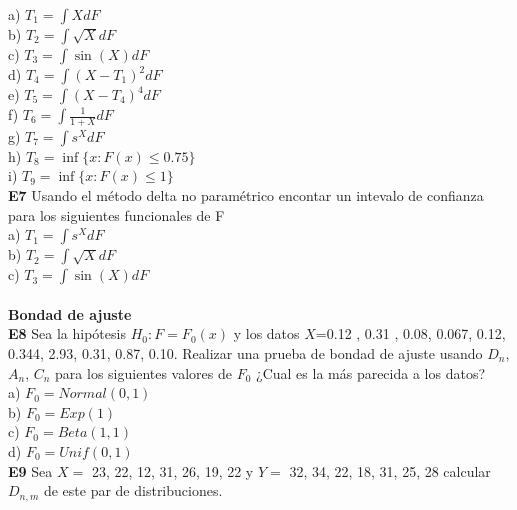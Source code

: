 \documentclass[11pt,spanish]{article}
\begin{document}
\hspace*{6mm} a) $T_1 = \int X dF$ \\
\hspace*{6mm} b) $T_2 = \int \sqrt{X} dF$ \\
\hspace*{6mm} c) $T_3 = \int \sin(X) dF$ \\
\hspace*{6mm} d) $T_4 =\int (X-T_1)^2 dF$ \\
\hspace*{6mm} e) $T_5 =\int (X-T_4)^4 dF$ \\
\hspace*{6mm} f) $T_6 =\int \frac{1}{1+X} dF$ \\
\hspace*{6mm} g) $T_7 =\int s^X dF$ \\
\hspace*{6mm} h) $T_8 =\inf\{x:F(x)\leq 0.75 \}$\\
\hspace*{6mm} i) $T_9 =\inf\{x:F(x)\leq 1 \}$\\
\textbf{E7} Usando el método delta no paramétrico encontar un intevalo de confianza para los siguientes funcionales de F \\
\hspace*{6mm} a) $T_1 =\int s^X dF$ \\
\hspace*{6mm} b) $T_2 = \int \sqrt{X} dF$ \\
\hspace*{6mm} c) $T_3 = \int \sin(X) dF$ \\\\
\textbf{Bondad de ajuste}\\
\textbf{E8} Sea la hipótesis $H_0: F = F_0(x)$ y los datos $X$=0.12 , 0.31 , 0.08, 0.067, 0.12, 0.344, 2.93, 0.31, 0.87, 0.10. Realizar una prueba de bondad de ajuste usando $D_n$, $A_n$, $C_n$ para los siguientes valores de $F_0$ ¿Cual es la más parecida a los datos?\\
\hspace*{6mm} a) $F_0=Normal(0,1)$ \\
\hspace*{6mm} b) $F_0=Exp(1)$\\
\hspace*{6mm} c) $F_0=Beta(1,1)$ \\
\hspace*{6mm} d) $F_0 =Unif(0,1)$ \\
\textbf{E9} Sea $X =$ 23, 22, 12, 31, 26, 19, 22 y $Y=$ 32, 34, 22, 18, 31, 25, 28 calcular $D_{n,m}$ de este par de distribuciones. \\\\
\end{document}
